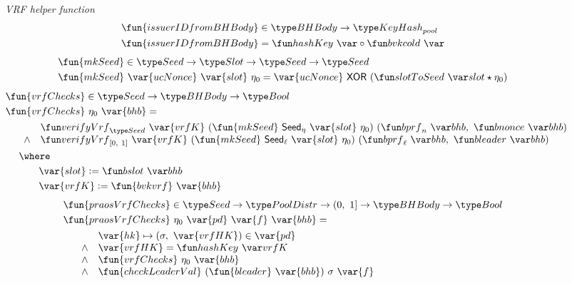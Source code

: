 \begin{figure}
  \emph{VRF helper function}
  \begin{align*}
      & \fun{issuerIDfromBHBody} \in \BHBody \to \KeyHash_{pool} \\
      & \fun{issuerIDfromBHBody} = \hashKey{} \circ \bvkcold{} \\
  \end{align*}
  \begin{align*}
      & \fun{mkSeed} \in \Seed \to \Slot \to \Seed \to \Seed \\
      & \fun{mkSeed}~\var{ucNonce}~\var{slot}~\eta_0 =
        \var{ucNonce}~\mathsf{XOR}~(\slotToSeed{slot}\seedOp\eta_0)\\
  \end{align*}
  \begin{align*}
      & \fun{vrfChecks} \in \Seed \to \BHBody \to \Bool \\
      & \fun{vrfChecks}~\eta_0~\var{bhb} = \\
      & \begin{array}{cl}
        ~~~~ &
        \verifyVrf{\Seed}{\var{vrfK}}{(\fun{mkSeed}~\Seede~\var{slot}~\eta_0)}
               {(\bprfn{bhb},~\bnonce{bhb}}) \\
        ~~~~ \land &
               \verifyVrf{\unitInterval}{\var{vrfK}}{(\fun{mkSeed}~\Seedl~\var{slot}~\eta_0)}
               {(\bprfl{bhb},~\bleader{bhb}}) \\
      \end{array} \\
      & ~~~~\where \\
      & ~~~~~~~~~~\var{slot} \leteq \bslot{bhb} \\
      & ~~~~~~~~~~\var{vrfK} \leteq \fun{bvkvrf}~\var{bhb} \\
  \end{align*}
  \begin{align*}
      & \fun{praosVrfChecks} \in \Seed \to \PoolDistr \to \unitIntervalNonNull \to \BHBody \to \Bool \\
      & \fun{praosVrfChecks}~\eta_0~\var{pd}~\var{f}~\var{bhb} = \\
      & \begin{array}{cl}
        ~~~~ & \var{hk}\mapsto (\sigma,~\var{vrfHK})\in\var{pd} \\
        ~~~~ \land & \var{vrfHK} = \hashKey{vrfK} \\
        ~~~~ \land & \fun{vrfChecks}~\eta_0~\var{bhb} \\
        ~~~~ \land & \fun{checkLeaderVal}~(\fun{bleader}~\var{bhb})~\sigma~\var{f} \\

\end{array}
\end{align*}
\end{figure}
